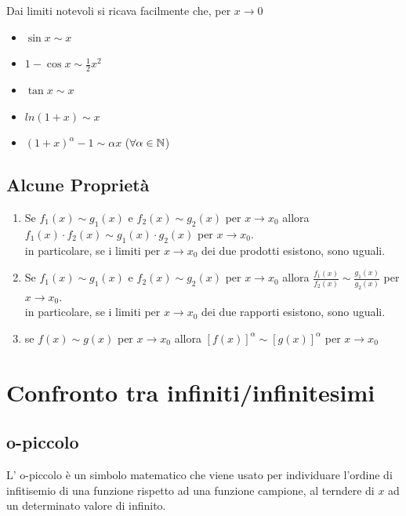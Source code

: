 \documentclass[12pt, a4paper, openany]{book}
\begin{document}
	Dai limiti notevoli si ricava facilmente che, per $x \to 0$
	\begin{itemize}
		\item $\sin x \sim x$
		\item $1 - \cos x \sim \frac{1}{2}x^2$
		\item $\tan x \sim x$
		\item $ln(1+x) \sim x$
		\item $(1+x)^\alpha -1 \sim \alpha x$ ($\forall \alpha \in \mathbb{N}$)
	\end{itemize}
	\subsection*{Alcune Proprietà}
	\begin{enumerate}
		\item Se $f_1(x) \sim g_1(x)$ e $f_2(x) \sim g_2(x)$ per $x \to x_0$ allora $f_1(x) \cdot f_2(x) \sim g_1(x) \cdot g_2(x)$ per $x \to x_0$.
		      \\in particolare, se i limiti per $x \to x_0$ dei due prodotti esistono, sono uguali.
		\item Se $f_1(x) \sim g_1(x)$ e $f_2(x) \sim g_2(x)$ per $x \to x_0$ allora $\frac{f_1(x)}{f_2(x)} \sim \frac{g_1(x)}{g_2(x)}$ per $x \to x_0$.
		      \\in particolare, se i limiti per $x \to x_0$ dei due rapporti esistono, sono uguali.
		\item se $f(x) \sim g(x)$ per $x \to x_0$ allora $[f(x)]^\alpha \sim [g(x)]^\alpha$ per $x \to x_0$
	\end{enumerate}
	\section{Confronto tra infiniti/infinitesimi}
	\subsection*{o-piccolo}
	L' o-piccolo è un simbolo matematico che viene usato per individuare l'ordine di infitisemio di una funzione rispetto ad una funzione campione,
	al terndere di $x$ ad un determinato valore di infinito.
\end{document}
